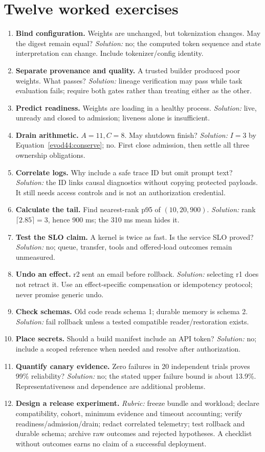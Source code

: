 \section{Twelve worked exercises}
\begin{enumerate}
\item \textbf{Bind configuration.} Weights are unchanged, but tokenization changes.
May the digest remain equal? \emph{Solution:} no; the computed token sequence
and state interpretation can change. Include tokenizer/config identity.
\item \textbf{Separate provenance and quality.} A trusted builder produced poor
weights. What passes? \emph{Solution:} lineage verification may pass while task
evaluation fails; require both gates rather than treating either as the other.
\item \textbf{Predict readiness.} Weights are loading in a healthy process.
\emph{Solution:} live, unready and closed to admission; liveness alone is insufficient.
\item \textbf{Drain arithmetic.} $A=11,C=8$. May shutdown finish?
\emph{Solution:} $I=3$ by Equation~\ref{evod44:conserve}; no. First close admission,
then settle all three ownership obligations.
\item \textbf{Correlate logs.} Why include a safe trace ID but omit prompt text?
\emph{Solution:} the ID links causal diagnostics without copying protected payloads.
It still needs access controls and is not an authorization credential.
\item \textbf{Calculate the tail.} Find nearest-rank p95 of $(10,20,900)$.
\emph{Solution:} rank $\lceil2.85\rceil=3$, hence 900 ms; the 310 ms mean hides it.
\item \textbf{Test the SLO claim.} A kernel is twice as fast. Is the service SLO proved?
\emph{Solution:} no; queue, transfer, tools and offered-load outcomes remain unmeasured.
\item \textbf{Undo an effect.} r2 sent an email before rollback.
\emph{Solution:} selecting r1 does not retract it. Use an effect-specific compensation
or idempotency protocol; never promise generic undo.
\item \textbf{Check schemas.} Old code reads schema 1; durable memory is schema 2.
\emph{Solution:} fail rollback unless a tested compatible reader/restoration exists.
\item \textbf{Place secrets.} Should a build manifest include an API token?
\emph{Solution:} no; include a scoped reference when needed and resolve after authorization.
\item \textbf{Quantify canary evidence.} Zero failures in 20 independent trials proves
99\% reliability? \emph{Solution:} no; the stated upper failure bound is about 13.9\%.
Representativeness and dependence are additional problems.
\item \textbf{Design a release experiment.} \emph{Rubric:} freeze bundle and workload;
declare compatibility, cohort, minimum evidence and timeout accounting; verify
readiness/admission/drain; redact correlated telemetry; test rollback and durable
schema; archive raw outcomes and rejected hypotheses. A checklist without outcomes
earns no claim of a successful deployment.
\end{enumerate}

